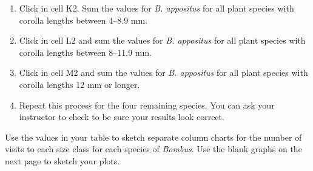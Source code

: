 \documentclass[12pt, hidelinks]{exam}
\begin{document}
\begin{questions}
\begin{enumerate}
	\item Click in cell K2. Sum the values for \textit{B. appositus} for
	all plant species with corolla lengths between 4–8.9 mm. 
	
	\item Click in cell L2 and sum the values for \textit{B. appositus} for
	all plant species with corolla lengths between 8–11.9 mm.
	
	\item Click in cell M2 and sum the values for \textit{B. appositus} for
	all plant species with corolla lengths 12 mm or longer.
	
	\item Repeat this process for the four remaining species. You can ask your instructor to check to be sure your results look correct. 
	
\end{enumerate}

\question
Use the values in your table to sketch separate column charts for the number
of visits to each size class for each species of \textit{Bombus}. Use the
blank graphs on the next page to sketch your plots.

\newpage


\end{questions}
\end{document}
